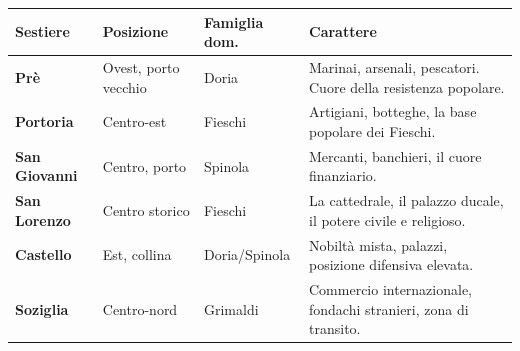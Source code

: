 \begin{center}
\begin{tabularx}{\textwidth}{L{2.5cm} L{3cm} L{2.5cm} X}
  \toprule
  \textbf{Sestiere} & \textbf{Posizione} & \textbf{Famiglia dom.} & \textbf{Carattere} \\
  \midrule

  \textbf{Prè} & Ovest, porto vecchio & Doria & Marinai, arsenali, pescatori. Cuore della resistenza popolare. \\

  \textbf{Portoria} & Centro-est & Fieschi & Artigiani, botteghe, la base popolare dei Fieschi. \\

  \textbf{San Giovanni} & Centro, porto & Spinola & Mercanti, banchieri, il cuore finanziario. \\

  \textbf{San Lorenzo} & Centro storico & Fieschi & La cattedrale, il palazzo ducale, il potere civile e religioso. \\

  \textbf{Castello} & Est, collina & Doria/Spinola & Nobiltà mista, palazzi, posizione difensiva elevata. \\

  \textbf{Soziglia} & Centro-nord & Grimaldi & Commercio internazionale, fondachi stranieri, zona di transito. \\
  \bottomrule
\end{tabularx}
\end{center}

